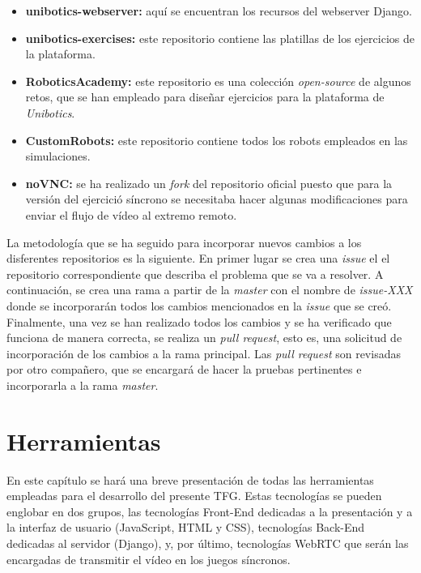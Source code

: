 \documentclass[a4paper, 12pt]{book}
\begin{document}
\begin{itemize}
\item \textbf{unibotics-webserver:} aquí se encuentran los recursos del webserver Django.
\item \textbf{unibotics-exercises:} este repositorio contiene las platillas de los ejercicios de la plataforma.
\item \textbf{RoboticsAcademy:} este repositorio es una colección \emph{open-source} de algunos retos, que se han empleado para diseñar ejercicios para la plataforma de \emph{Unibotics}.
\item \textbf{CustomRobots:} este repositorio contiene todos los robots empleados en las simulaciones.
\item \textbf{noVNC:} se ha realizado un \emph{fork} del repositorio oficial puesto que para la versión del ejercició síncrono se necesitaba hacer algunas modificaciones para enviar el flujo de vídeo al extremo remoto.
\end{itemize}

La metodología que se ha seguido para incorporar nuevos cambios a los disferentes repositorios es la siguiente. En primer lugar se crea una \emph{issue} el el repositorio correspondiente que describa el problema que se va a resolver. A continuación, se crea una rama a partir de la \emph{master} con el nombre de \emph{issue-XXX} donde se incorporarán todos los cambios mencionados en la \emph{issue} que se creó. Finalmente, una vez se han realizado todos los cambios y se ha verificado que funciona de manera correcta, se realiza un \emph{pull request}, esto es, una solicitud de incorporación de los cambios a la rama principal. Las \emph{pull request} son revisadas por otro compañero, que se encargará de hacer la pruebas pertinentes e incorporarla a la rama \emph{master}.


\cleardoublepage %
\chapter{Herramientas} 
\label{chap:herramientas}

En este capítulo se hará una breve presentación de todas las herramientas empleadas para el desarrollo del presente TFG. Estas tecnologías se pueden englobar en dos grupos, las tecnologías Front-End dedicadas a la presentación y a la interfaz de usuario (JavaScript, HTML y CSS), tecnologías Back-End dedicadas al servidor (Django), y, por último, tecnologías WebRTC que serán las encargadas de transmitir el vídeo en los juegos síncronos. 
\end{document}
